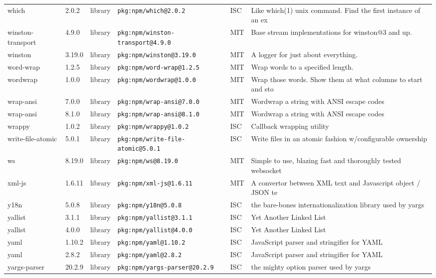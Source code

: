 \documentclass[11pt]{article}
\begin{document}
\begin{longtable}{|l|l|l|p{2.2cm}|l|p{4cm}|}
which & 2.0.2 & library & \texttt{pkg:npm/which@2.0.2} & ISC & Like which(1) unix command. Find the first instance of an ex \\
winston-transport & 4.9.0 & library & \texttt{pkg:npm/winston-transport@4.9.0} & MIT & Base stream implementations for winston@3 and up. \\
winston & 3.19.0 & library & \texttt{pkg:npm/winston@3.19.0} & MIT & A logger for just about everything. \\
word-wrap & 1.2.5 & library & \texttt{pkg:npm/word-wrap@1.2.5} & MIT & Wrap words to a specified length. \\
wordwrap & 1.0.0 & library & \texttt{pkg:npm/wordwrap@1.0.0} & MIT & Wrap those words. Show them at what columns to start and sto \\
wrap-ansi & 7.0.0 & library & \texttt{pkg:npm/wrap-ansi@7.0.0} & MIT & Wordwrap a string with ANSI escape codes \\
wrap-ansi & 8.1.0 & library & \texttt{pkg:npm/wrap-ansi@8.1.0} & MIT & Wordwrap a string with ANSI escape codes \\
wrappy & 1.0.2 & library & \texttt{pkg:npm/wrappy@1.0.2} & ISC & Callback wrapping utility \\
write-file-atomic & 5.0.1 & library & \texttt{pkg:npm/write-file-atomic@5.0.1} & ISC & Write files in an atomic fashion w/configurable ownership \\
ws & 8.19.0 & library & \texttt{pkg:npm/ws@8.19.0} & MIT & Simple to use, blazing fast and thoroughly tested websocket  \\
xml-js & 1.6.11 & library & \texttt{pkg:npm/xml-js@1.6.11} & MIT & A convertor between XML text and Javascript object / JSON te \\
y18n & 5.0.8 & library & \texttt{pkg:npm/y18n@5.0.8} & ISC & the bare-bones internationalization library used by yargs \\
yallist & 3.1.1 & library & \texttt{pkg:npm/yallist@3.1.1} & ISC & Yet Another Linked List \\
yallist & 4.0.0 & library & \texttt{pkg:npm/yallist@4.0.0} & ISC & Yet Another Linked List \\
yaml & 1.10.2 & library & \texttt{pkg:npm/yaml@1.10.2} & ISC & JavaScript parser and stringifier for YAML \\
yaml & 2.8.2 & library & \texttt{pkg:npm/yaml@2.8.2} & ISC & JavaScript parser and stringifier for YAML \\
yargs-parser & 20.2.9 & library & \texttt{pkg:npm/yargs-parser@20.2.9} & ISC & the mighty option parser used by yargs \\

\end{longtable}
\end{document}
